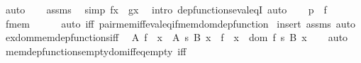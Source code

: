 \begin{isabellebody}
\ auto\isanewline
\ \ \isamarkupfalse%
\ assms\ \isamarkupfalse%
\ {\isacharbrackleft}{\kern0pt}simp{\isacharbrackright}{\kern0pt}{\isacharcolon}{\kern0pt}\ {\isachardoublequoteopen}f{\isacharbackquote}{\kern0pt}x\ {\isacharequal}{\kern0pt}\ g{\isacharbackquote}{\kern0pt}x{\isachardoublequoteclose}\ \isamarkupfalse%
\ {\isacharparenleft}{\kern0pt}intro\ dep{\isacharunderscore}{\kern0pt}functions{\isacharunderscore}{\kern0pt}eval{\isacharunderscore}{\kern0pt}eqI{\isacharparenright}{\kern0pt}\ auto\isanewline
\ \ \isamarkupfalse%
\ {\isachardoublequoteopen}p\ {\isasymin}\ f{\isachardoublequoteclose}\ \isamarkupfalse%
\ f{\isacharunderscore}{\kern0pt}mem\isanewline
\ \ \ \ \isamarkupfalse%
\ {\isacharparenleft}{\kern0pt}auto\ iff{\isacharcolon}{\kern0pt}\ pair{\isacharunderscore}{\kern0pt}mem{\isacharunderscore}{\kern0pt}iff{\isacharunderscore}{\kern0pt}eval{\isacharunderscore}{\kern0pt}eq{\isacharunderscore}{\kern0pt}if{\isacharunderscore}{\kern0pt}mem{\isacharunderscore}{\kern0pt}dom{\isacharunderscore}{\kern0pt}dep{\isacharunderscore}{\kern0pt}function{\isacharparenright}{\kern0pt}\isanewline
{}\isamarkupfalse%
\ {\isacharparenleft}{\kern0pt}insert\ assms{\isacharcomma}{\kern0pt}\ auto{\isacharparenright}{\kern0pt}%
\endisatagproof
{\isafoldproof}%
%
\isadelimproof
\isanewline
%
\endisadelimproof
\isanewline
{}\isamarkupfalse%
\ ex{\isacharunderscore}{\kern0pt}dom{\isacharunderscore}{\kern0pt}mem{\isacharunderscore}{\kern0pt}dep{\isacharunderscore}{\kern0pt}functions{\isacharunderscore}{\kern0pt}iff{\isacharcolon}{\kern0pt}\isanewline
\ \ {\isachardoublequoteopen}{\isacharparenleft}{\kern0pt}{\isasymexists}A{\isachardot}{\kern0pt}\ f\ {\isasymin}\ {\isacharparenleft}{\kern0pt}x\ {\isasymin}\ A{\isacharparenright}{\kern0pt}\ {\isasymrightarrow}s\ {\isacharparenleft}{\kern0pt}B\ x{\isacharparenright}{\kern0pt}{\isacharparenright}{\kern0pt}\ {\isasymlongleftrightarrow}\ f\ {\isasymin}\ {\isacharparenleft}{\kern0pt}x\ {\isasymin}\ dom\ f{\isacharparenright}{\kern0pt}\ {\isasymrightarrow}s\ {\isacharparenleft}{\kern0pt}B\ x{\isacharparenright}{\kern0pt}{\isachardoublequoteclose}\isanewline
%
\isadelimproof
\ \ %
\endisadelimproof
%
\isatagproof
{}\isamarkupfalse%
\ auto%
\endisatagproof
{\isafoldproof}%
%
\isadelimproof
\isanewline
%
\endisadelimproof
\isanewline
{}\isamarkupfalse%
\ mem{\isacharunderscore}{\kern0pt}dep{\isacharunderscore}{\kern0pt}functions{\isacharunderscore}{\kern0pt}empty{\isacharunderscore}{\kern0pt}dom{\isacharunderscore}{\kern0pt}iff{\isacharunderscore}{\kern0pt}eq{\isacharunderscore}{\kern0pt}empty\ {\isacharbrackleft}{\kern0pt}iff{\isacharbrackright}{\kern0pt}{\isacharcolon}{\kern0pt}\isanewline

\end{isabellebody}

